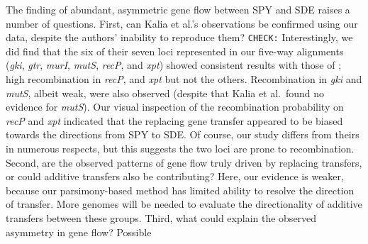 \documentclass[12pt]{article}
\begin{document}
The finding of abundant, asymmetric gene flow between
SPY and SDE raises a number of questions.
First, can Kalia et al.'s \citeyearpar{Kalia2001} observations be
confirmed using our data, despite the authors' inability to reproduce them?
\texttt{CHECK:} 
Interestingly, we did find 
that the six of their seven loci represented in our five-way alignments
(\textit{gki}, \textit{gtr}, 
\textit{murI}, \textit{mutS}, \textit{recP}, and \textit{xpt}) showed
consistent results with those of \citet{Kalia2001}; high recombination in 
\textit{recP}, and \textit{xpt} but not the others. 
Recombination in \textit{gki} and \textit{mutS}, albeit weak, were also
observed (despite that Kalia et al.\ found no evidence for {\em mutS}).
Our visual inspection of the recombination probability on 
\textit{recP} and \textit{xpt} indicated that 
the replacing gene transfer appeared to be biased towards
the directions from SPY to SDE.
% 
%
%
%
%
%
%
Of course, our study differs from theirs in numerous respects, but this
suggests the two loci are prone to recombination.
Second, are the observed patterns of gene flow truly driven by replacing
transfers, or could additive transfers also be contributing?  Here, our
evidence is weaker, because our parsimony-based method has limited ability
to resolve the direction of transfer.  More genomes will be needed to
evaluate the directionality of additive transfers between these groups.
Third, what could explain the observed asymmetry in gene flow?  Possible
\end{document}
